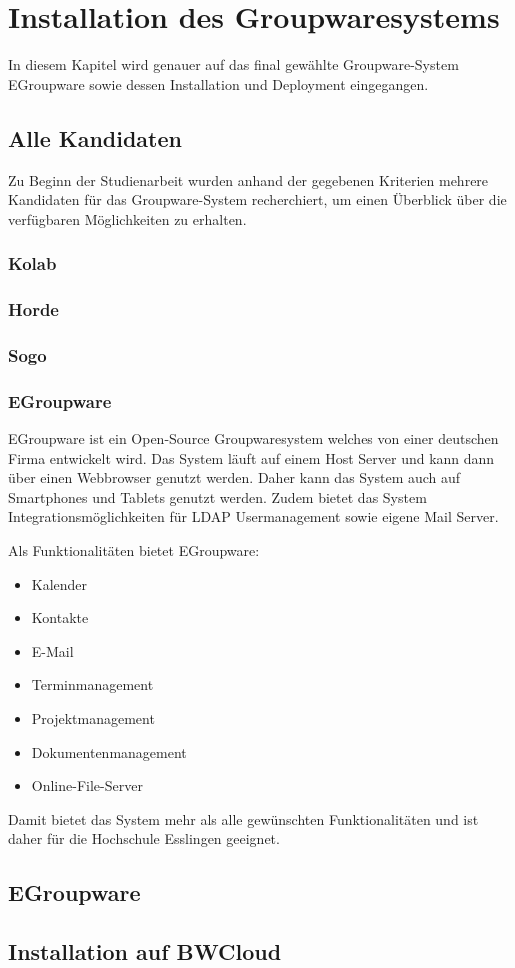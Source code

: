 \chapter{Installation des Groupwaresystems}

In diesem Kapitel wird genauer auf das final gewählte Groupware-System EGroupware sowie dessen Installation und Deployment eingegangen.

\section{Alle Kandidaten}

Zu Beginn der Studienarbeit wurden anhand der gegebenen Kriterien mehrere Kandidaten für das Groupware-System recherchiert, um einen Überblick über die verfügbaren Möglichkeiten zu erhalten.

\subsection{Kolab}

\autocite{kolab}

\subsection{Horde}

\autocite{horde}

\subsection{Sogo}

\autocite{sogo}

\subsection{EGroupware}

EGroupware ist ein Open-Source Groupwaresystem welches von einer deutschen Firma entwickelt wird.
Das System läuft auf einem Host Server und kann dann über einen Webbrowser genutzt werden.
Daher kann das System auch auf Smartphones und Tablets genutzt werden.
Zudem bietet das System Integrationsmöglichkeiten für LDAP Usermanagement sowie eigene Mail Server.

Als Funktionalitäten bietet EGroupware:

\begin{itemize}
    \item Kalender
    \item Kontakte
    \item E-Mail
    \item Terminmanagement
    \item Projektmanagement
    \item Dokumentenmanagement
    \item Online-File-Server
\end{itemize}

Damit bietet das System mehr als alle gewünschten Funktionalitäten und ist daher für die Hochschule Esslingen geeignet.
\section{EGroupware}



\section{Installation auf BWCloud}